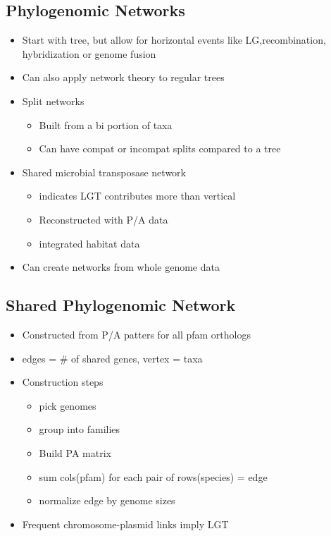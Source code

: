 \documentclass[10pt,letter]{article}
\begin{document}
\subsection*{Phylogenomic Networks}
\begin{itemize}
    \item Start with tree, but allow for horizontal events like LG,recombination, hybridization or genome fusion
    \item Can also apply network theory to regular trees
    \item Split networks
    \begin{itemize}
        \item Built from a bi portion of taxa
        \item Can have compat or incompat splits compared to a tree
    \end{itemize}
    \item Shared microbial transposase network
    \begin{itemize}
        \item indicates LGT contributes more than vertical
        \item Reconstructed with P/A data
        \item integrated habitat data
    \end{itemize}
    \item Can create networks from whole genome data
\end{itemize}
\subsection*{Shared Phylogenomic Network}
\begin{itemize}
    \item Constructed from P/A patters for all pfam orthologs
    \item edges = # of shared genes, vertex = taxa
    \item Construction steps
    \begin{itemize}
        \item pick genomes
        \item group into families
        \item Build PA matrix
        \item sum cols(pfam) for each pair of rows(species) = edge
        \item normalize edge by genome sizes
    \end{itemize}
    \item Frequent chromosome-plasmid links imply LGT
\end{itemize}
\end{document}

